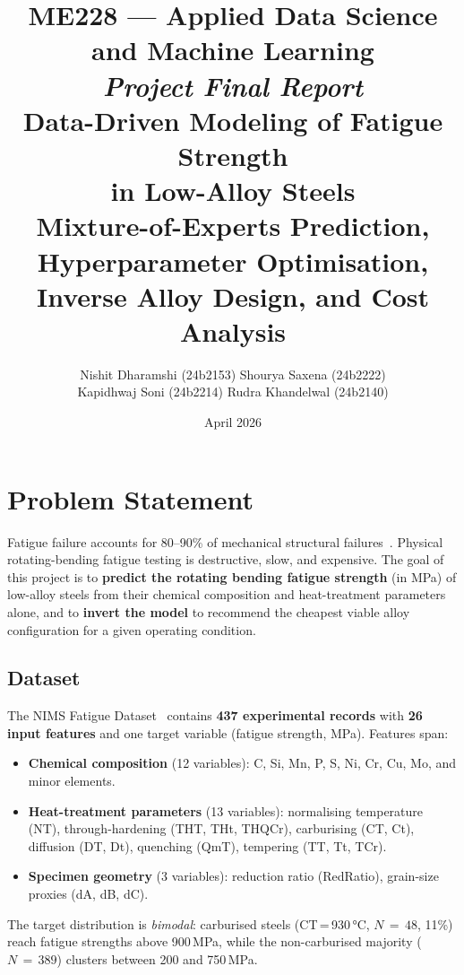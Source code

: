 \documentclass[12pt,a4paper]{article}
\title{
  \Large\textbf{ME228 — Applied Data Science and Machine Learning}\\[2pt]
  \large\textit{Project Final Report}\\[6pt]
  \LARGE Data-Driven Modeling of Fatigue Strength\\in Low-Alloy Steels\\[8pt]
  \large Mixture-of-Experts Prediction, Hyperparameter Optimisation,\\
         Inverse Alloy Design, and Cost Analysis
}
\author{
  Nishit Dharamshi (24b2153) \quad Shourya Saxena (24b2222) \\[2pt]
  Kapidhwaj Soni (24b2214) \quad Rudra Khandelwal (24b2140)
}
\date{April 2026}
\begin{document}
\maketitle
\tableofcontents
\newpage

\section{Problem Statement}

Fatigue failure accounts for 80--90\% of mechanical structural failures~\cite{agrawal2014}. Physical
rotating-bending fatigue testing is destructive, slow, and expensive. The goal of this project is
to \textbf{predict the rotating bending fatigue strength} (in MPa) of low-alloy steels from their
chemical composition and heat-treatment parameters alone, and to \textbf{invert the model} to
recommend the cheapest viable alloy configuration for a given operating condition.

\subsection{Dataset}

The NIMS Fatigue Dataset~\cite{agrawal2014} contains \textbf{437 experimental records} with
\textbf{26 input features} and one target variable (fatigue strength, MPa). Features span:

\begin{itemize}[nosep]
  \item \textbf{Chemical composition} (12 variables): C, Si, Mn, P, S, Ni, Cr, Cu, Mo, and minor elements.
  \item \textbf{Heat-treatment parameters} (13 variables): normalising temperature (NT), through-hardening
        (THT, THt, THQCr), carburising (CT, Ct), diffusion (DT, Dt), quenching (QmT), tempering (TT, Tt, TCr).
  \item \textbf{Specimen geometry} (3 variables): reduction ratio (RedRatio), grain-size proxies (dA, dB, dC).
\end{itemize}

The target distribution is \textit{bimodal}: carburised steels (CT\,=\,930\,°C, $N\,{=}\,48$, 11\%) reach
fatigue strengths above 900\,MPa, while the non-carburised majority ($N\,{=}\,389$) clusters
between 200 and 750\,MPa.


\end{document}
